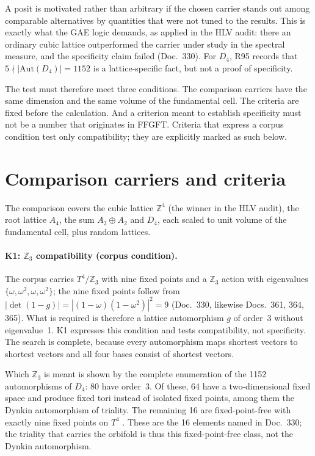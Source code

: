 A posit is motivated rather than arbitrary if the chosen carrier stands out
among comparable alternatives by quantities that were not tuned to the
results. This is exactly what the GAE logic demands, as applied in the HLV
audit: there an ordinary cubic lattice outperformed the carrier under study in
the spectral measure, and the specificity claim failed (Doc.~330). For $D_4$,
R95 records that $5\nmid|\mathrm{Aut}(D_4)|=1152$ is a lattice-specific fact,
but not a proof of specificity.

The test must therefore meet three conditions. The comparison carriers have
the same dimension and the same volume of the fundamental cell. The criteria
are fixed before the calculation. And a criterion meant to establish
specificity must not be a number that originates in FFGFT. Criteria that
express a corpus condition test only compatibility; they are explicitly
marked as such below.

\section{Comparison carriers and criteria}

The comparison covers the cubic lattice $\mathbb{Z}^4$ (the winner in the HLV
audit), the root lattice $A_4$, the sum $A_2\oplus A_2$ and $D_4$, each scaled to
unit volume of the fundamental cell, plus random lattices.

\paragraph{K1: $\mathbb{Z}_3$ compatibility (corpus condition).}
The corpus carries $T^4/\mathbb{Z}_3$ with nine fixed points and a $\mathbb{Z}_3$
action with eigenvalues $\{\omega,\omega^2,\omega,\omega^2\}$; the nine fixed points
follow from $|\det(1-g)|=|(1-\omega)(1-\omega^2)|^2=9$ (Doc.~330, likewise
Docs.~361, 364, 365). What is required is therefore a lattice automorphism $g$
of order~3 without eigenvalue~1. K1 expresses this condition and tests
compatibility, not specificity. The search is complete, because every
automorphism maps shortest vectors to shortest vectors and all four bases
consist of shortest vectors.

Which $\mathbb{Z}_3$ is meant is shown by the complete enumeration of the 1152
automorphisms of $D_4$: 80 have order~3. Of these, 64 have a two-dimensional
fixed space and produce fixed tori instead of isolated fixed points, among
them the Dynkin automorphism of triality. The remaining 16 are
fixed-point-free with exactly nine fixed points on $T^4$ \KM. These are the
16 elements named in Doc.~330; the triality that carries the orbifold is thus
this fixed-point-free class, not the Dynkin automorphism.

